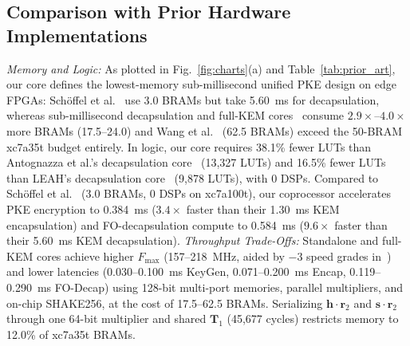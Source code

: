 \documentclass[journal]{IEEEtran}
\begin{document}
\subsection{Comparison with Prior Hardware Implementations}
\textit{Memory and Logic:} As plotted in Fig.~\ref{fig:charts}(a) and Table~\ref{tab:prior_art}, our core defines the lowest-memory sub-millisecond unified PKE design on edge FPGAs: Sch{\"o}ffel et al.~\cite{schoeffel2022code} use 3.0 BRAMs but take 5.60~ms for decapsulation, whereas sub-millisecond decapsulation and full-KEM cores~\cite{deshpande2023fast, antognazza2024high, tu2024leah} consume $2.9\times$--$4.0\times$ more BRAMs (17.5--24.0) and Wang et al.~\cite{wang2024high} (62.5 BRAMs) exceed the 50-BRAM xc7a35t budget entirely. In logic, our core requires 38.1\% fewer LUTs than Antognazza et al.'s decapsulation core~\cite{antognazza2024high} (13,327 LUTs) and 16.5\% fewer LUTs than LEAH's decapsulation core~\cite{tu2024leah} (9,878 LUTs), with 0 DSPs. Compared to Sch{\"o}ffel et al.~\cite{schoeffel2022code} (3.0 BRAMs, 0 DSPs on xc7a100t), our coprocessor accelerates PKE encryption to 0.384~ms ($3.4\times$ faster than their 1.30~ms KEM encapsulation) and FO-decapsulation compute to 0.584~ms ($9.6\times$ faster than their 5.60~ms KEM decapsulation).
\textit{Throughput Trade-Offs:} Standalone and full-KEM cores achieve higher $F_{\max}$ (157--218~MHz, aided by $-3$ speed grades in~\cite{deshpande2023fast, antognazza2024high, wang2024high}) and lower latencies (0.030--0.100~ms KeyGen, 0.071--0.200~ms Encap, 0.119--0.290~ms FO-Decap) using 128-bit multi-port memories, parallel multipliers, and on-chip SHAKE256, at the cost of 17.5--62.5 BRAMs. Serializing $\mathbf{h}\cdot\mathbf{r}_2$ and $\mathbf{s}\cdot\mathbf{r}_2$ through one 64-bit multiplier and shared $\mathbf{T}_1$ (45,677 cycles) restricts memory to 12.0\% of xc7a35t BRAMs.
\end{document}
